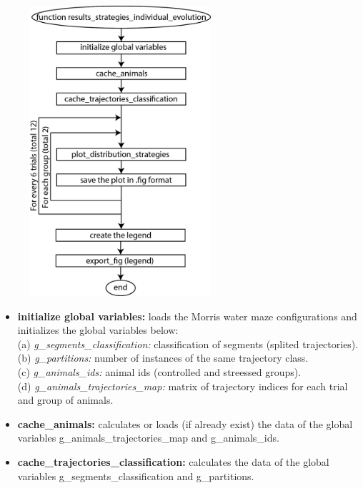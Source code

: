 \documentclass[12pt,titlepage]{article}
\begin{document}
\begin{doublespace}
\begin{figure}[H]
	\begin{center}
		\includegraphics[width=0.6\textwidth]{results_strategies_individual_evolution.jpg}
		\label{fig4}
	\end{center}
\end{figure}

\begin{itemize}
	\item\textbf{initialize global variables:} loads the Morris water maze configurations and initializes the global variables below:\\
	(a) \textit{g\_segments\_classification:} classification of segments (splited trajectories).\\
	(b) \textit{g\_partitions:} number of instances of the same trajectory class.\\
	(c) \textit{g\_animals\_ids:} animal ids (controlled and streessed groups).\\
	(d) \textit{g\_animals\_trajectories\_map:} matrix of trajectory indices for each trial and group of animals.
	\item\textbf{cache\_animals:} calculates or loads (if already exist) the data of the global variables g\_animals\_trajectories\_map and g\_animals\_ids.
	\item\textbf{cache\_trajectories\_classification:}  calculates the data of the global variables g\_segments\_classification and g\_partitions.
\end{itemize}


\end{doublespace}
\end{document}
